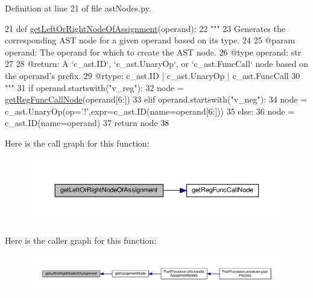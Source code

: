 Definition at line 21 of file ast\+Nodes.\+py.


\begin{DoxyCode}
21 \textcolor{keyword}{def }\hyperlink{namespacePostProcessor_1_1astNodes_afb1489449acb633bf78b48165fe578be}{getLeftOrRightNodeOfAssignment}(operand):
22     \textcolor{stringliteral}{"""
}
23 \textcolor{stringliteral}{    Generates the corresponding AST node for a given operand based on its type.
}
24 \textcolor{stringliteral}{
}
25 \textcolor{stringliteral}{    @param operand: The operand for which to create the AST node.
}
26 \textcolor{stringliteral}{    @type operand: str
}
27 \textcolor{stringliteral}{
}
28 \textcolor{stringliteral}{    @return: A `c\_ast.ID`, `c\_ast.UnaryOp`, or `c\_ast.FuncCall` node based on the operand's prefix.
}
29 \textcolor{stringliteral}{    @rtype: c\_ast.ID | c\_ast.UnaryOp | c\_ast.FuncCall
}
30 \textcolor{stringliteral}{    """}
31     \textcolor{keywordflow}{if} operand.startswith(\textcolor{stringliteral}{"v\_reg"}):
32         node = \hyperlink{namespacePostProcessor_1_1astNodes_a30de65f8e1753733f88a01d42927ef1b}{getRegFuncCallNode}(operand[6:])
33     \textcolor{keywordflow}{elif} operand.startswith(\textcolor{stringliteral}{"v\_neg"}):
34             node = c\_ast.UnaryOp(op=\textcolor{stringliteral}{'!'},expr=c\_ast.ID(name=operand[6:]))
35     \textcolor{keywordflow}{else}:
36         node = c\_ast.ID(name=operand)
37     \textcolor{keywordflow}{return} node
38 
\end{DoxyCode}
Here is the call graph for this function\+:\nopagebreak
\begin{figure}[H]
\begin{center}
\leavevmode
\includegraphics[width=350pt]{namespacePostProcessor_1_1astNodes_afb1489449acb633bf78b48165fe578be_cgraph}
\end{center}
\end{figure}
Here is the caller graph for this function\+:\nopagebreak
\begin{figure}[H]
\begin{center}
\leavevmode
\includegraphics[width=350pt]{namespacePostProcessor_1_1astNodes_afb1489449acb633bf78b48165fe578be_icgraph}
\end{center}
\end{figure}
\mbox{\label{namespacePostProcessor_1_1astNodes_a30de65f8e1753733f88a01d42927ef1b}} 
